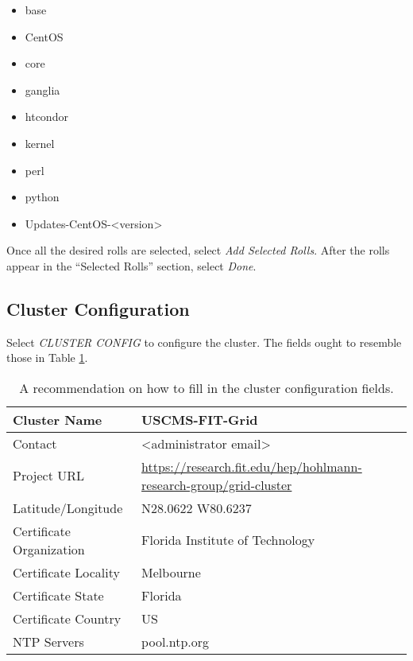 \documentclass[12pt]{article}
\begin{document}
\begin{multicols}{3}

\begin{itemize}
  \item base
  \item CentOS
  \item core
  \item ganglia
  \item htcondor
  \item kernel
  \item perl
  \item python
  \item Updates-CentOS-\textless version\textgreater
\end{itemize}

\end{multicols}

Once all the desired rolls are selected, select \textit{Add Selected
  Rolls}. After the rolls appear in the ``Selected Rolls'' section, select
\textit{Done}.

\subsection{Cluster Configuration}

\qq Select \textit{CLUSTER CONFIG} to configure the cluster. The fields ought to
resemble those in Table \ref{tab:clusterConfig}.

\begin{table}[H]
  \caption{A recommendation on how to fill in the cluster configuration fields.}
  \begin{center}
    \begin{tabular}{|l|l|}
      \hline
      Cluster Name & USCMS-FIT-Grid \\
      \hline
      Contact & \textless administrator email\textgreater \\
      \hline
      Project URL &
                    \url{https://research.fit.edu/hep/hohlmann-research-group/grid-cluster}
      \\
      \hline
      Latitude/Longitude & N28.0622 W80.6237 \\
      \hline
      Certificate Organization & Florida Institute of Technology \\
      \hline
      Certificate Locality & Melbourne \\
      \hline
      Certificate State & Florida \\
      \hline
      Certificate Country & US \\
      \hline
      NTP Servers & pool.ntp.org \\
    \hline
    \end{tabular}
  \end{center}
  \label{tab:clusterConfig}
\end{table}
\end{document}
